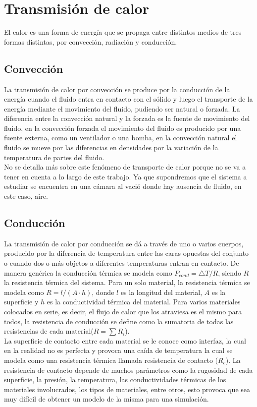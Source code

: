 \section{Transmisión de calor}
El calor es una forma de energía que se propaga entre distintos medios de tres formas distintas, por convección, radiación y conducción.
\subsection{Convección}
La transmisión de calor por convección se produce por la conducción de la energía cuando el fluido entra en contacto con el sólido y luego el transporte de la energía mediante el movimiento del fluido, pudiendo ser natural o forzada. La diferencia entre la convección natural y la forzada es la fuente de movimiento del fluido, en la convección forzada el movimiento del fluido es producido por una fuente externa, como un ventilador o una bomba, en la convección natural el fluido se mueve por las diferencias en densidades por la variación de la temperatura de partes del fluido.\\

No se detalla más sobre este fenómeno de transporte de calor porque no se va a tener en cuenta a lo largo de este trabajo. Ya que supondremos que el sistema a estudiar se encuentra en una cámara al vació donde hay ausencia de fluido, en este caso, aire.
\subsection{Conducción}
La transmisión de calor por conducción se dá a través de uno o varios cuerpos, producido por la diferencia de temperatura entre las caras opuestas del conjunto o cuando dos o más objetos a diferentes temperaturas entran en contacto. De manera genérica la conducción térmica se modela como $P_{cond}={\bigtriangleup T}/{R} $, siendo $R$ la resistencia térmica del sistema.
Para un solo material, la resistencia térmica se modela como $R = l/{\left(A\cdot h\right)}$, donde $l$ es la longitud del material, $A$ es la superficie y $h$ es la conductividad térmica del material. Para varios materiales colocados en serie, es decir, el flujo de calor que los atraviesa es el mismo para todos, la resistencia de conducción se define como la sumatoria de todas las resistencias de cada material($R=\sum R_i$).\\

La superficie de contacto entre cada material se le conoce como interfaz, la cual en la realidad no es perfecta y provoca una caída de temperatura la cual se modela como una resistencia térmica llamada resistencia de contacto ($R_c$). La resistencia de contacto depende de muchos parámetros como la rugosidad de cada superficie, la presión, la temperatura, las conductividades térmicas de los materiales involucrados, los tipos de materiales, entre otros, esto provoca que sea muy difícil de obtener un modelo de la misma para una simulación.\\

